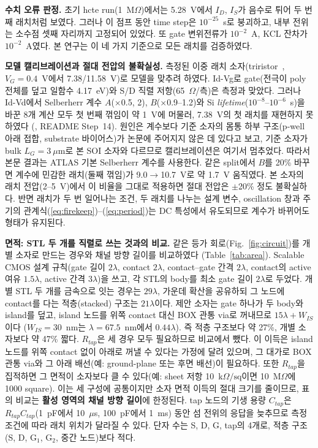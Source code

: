 \documentclass[journal]{IEEEtran}
\DeclareRobustCommand{\dpath}[1]{{\sffamily\scriptsize\seqsplit{#1}}}
\begin{document}
\textbf{수치 오류 판정.} 초기 hcte run(1~M$\Omega$)에서는 5.28~V에서 $I_D$, $I_S$가 음수로 튀어 두 번째 래치처럼 보였다. 그러나 이 점프 동안 time step은 $10^{-25}$~s로 붕괴하고, 내부 전위는 소수점 셋째 자리까지 고정되어 있었다. 또 gate 변위전류가 $10^{-2}$~A, KCL 잔차가 $10^{-2}$~A였다. 본 연구는 이 네 가지 기준으로 모든 래치를 검증하였다.

\textbf{모델 캘리브레이션과 절대 전압의 불확실성.} 측정된 이중 래치 소자(triristor~\cite{noh_triristor}, $V_G=0.4$~V에서 7.38/11.58~V)로 모델을 맞추려 하였다. Id-Vg로 gate(전극이 poly 전체를 덮고 일함수 4.17~eV)와 S/D 직렬 저항(65~$\Omega$/측)은 측정과 맞았다. 그러나 Id-Vd에서 Selberherr 계수 $A$($\times$0.5, 2), $B$($\times$0.9--1.2)와 Si \textit{lifetime}($10^{-8}$--$10^{-6}$~s)을 바꾼 8개 계산 모두 첫 번째 꺾임이 약 1~V에 머물러, 7.38~V의 첫 래치를 재현하지 못하였다 (\dpath{1010\_calib/TRI\_IV\_CAL*.log\_tr.log}, README Step~14). 원인은 계수보다 기준 소자의 몸통 하부 구조(p-well 아래 접합, substrate 바이어스)가 논문에 주어지지 않은 데 있다고 보고, 기준 소자가 bulk $L_G=3~\mu$m로 본 SOI 소자와 다르므로 캘리브레이션은 여기서 멈추었다. 따라서 본문 결과는 ATLAS 기본 Selberherr 계수를 사용한다. 같은 split에서 $B$를 20\% 바꾸면 계수에 민감한 래치(둘째 꺾임)가 9.0$\rightarrow$10.7~V로 약 1.7~V 움직였다. 본 소자의 래치 전압(2--5~V)에서 이 비율을 그대로 적용하면 절대 전압은 $\pm$20\% 정도 불확실하다. 반면 래치가 두 번 일어나는 조건, 두 래치를 나누는 설계 변수, oscillation 창과 주기의 관계식(\ref{eq:firekeep})--(\ref{eq:period})는 DC 특성에서 유도되므로 계수가 바뀌어도 형태가 유지된다.

\textbf{면적: STL 두 개를 직렬로 쓰는 것과의 비교.} 같은 등가 회로(Fig.~\ref{fig:circuit})를 개별 소자로 만드는 경우와 채널 방향 길이를 비교하였다 (Table~\ref{tab:area}). Scalable CMOS 설계 규칙(gate 길이 $2\lambda$, contact $2\lambda$, contact--gate 간격 $2\lambda$, contact의 active 여유 $1.5\lambda$, active 간격 $3\lambda$)을 쓰고, 각 STL의 body를 최소 gate 길이 $2\lambda$로 두었다. 개별 STL 두 개를 금속으로 잇는 경우는 $29\lambda$, 가운데 확산을 공유하되 그 노드에 contact를 다는 적층(stacked) 구조는 $21\lambda$이다. 제안 소자는 gate 하나가 두 body와 island를 덮고, island 노드를 위쪽 contact 대신 BOX 관통 via로 꺼내므로 $15\lambda+W_{IS}$이다 ($W_{IS}=30$~nm는 $\lambda=67.5$~nm에서 $0.44\lambda$). 즉 적층 구조보다 약 27\%, 개별 소자보다 약 47\% 짧다. $R_{tap}$은 세 경우 모두 필요하므로 비교에서 뺐다. 이 이득은 island 노드를 위쪽 contact 없이 아래로 꺼낼 수 있다는 가정에 달려 있으며, 그 대가로 BOX 관통 via와 그 아래 배선(예: ground-plane 또는 후면 배선)이 필요하다. 또한 $R_{tap}$을 집적하면 그 면적이 소자보다 클 수 있다(예: sheet 저항 10~k$\Omega/\mathrm{sq}$이면 10~M$\Omega$에 1000 square). 이는 세 구성에 공통이지만 소자 면적 이득의 절대 크기를 줄이므로, 표의 비교는 \textbf{활성 영역의 채널 방향 길이}에 한정된다. tap 노드의 기생 용량 $C_{tap}$은 $R_{tap}C_{tap}$(1~pF에서 10~$\mu$s, 100~pF에서 1~ms) 동안 섬 전위의 응답을 늦추므로 측정 조건에 따라 래치 위치가 달라질 수 있다. 단자 수는 S, D, G, tap의 4개로, 적층 구조(S, D, G$_1$, G$_2$, 중간 노드)보다 적다.
\end{document}
